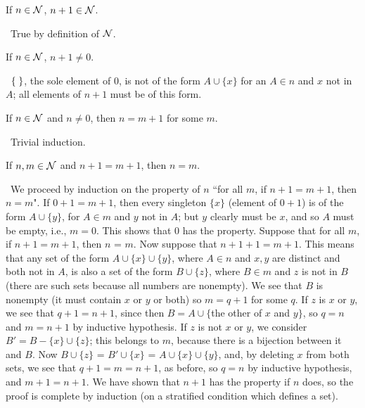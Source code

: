 \begin{thm}
 If $n \in {\cal N}$, $n+1 \in {\cal N}$.
\end{thm}

\preuve\ True by definition of ${\cal N}$.
\finpreuve

\begin{thm}
 If $n \in {\cal N}$, $n+1 \neq 0$.
\end{thm}

\preuve\ $\mbox{$\{\;\}$}$, the sole element of 0, is not of the form $A \cup \{x\}$ for
an $A \in n$ and $x$ not in $A$; all elements of $n+1$ must be of this form.
\finpreuve

\begin{thm}
 If $n \in {\cal N}$ and $n \neq 0$, then $n = m+1$ for some $m$.
\end{thm}

\preuve\ Trivial induction.
\finpreuve

\begin{thm}
 If $n,m \in {\cal N}$ and $n+1 = m+1$, then $n = m$.
\end{thm}

\preuve\ We proceed by induction on the property of $n$ ``for all $m$, if $n+1
= m+1$, then $n = m$".  If $0+1 = m+1$, then every singleton
$\{x\}$ (element of $0+1$) is of the form $A \cup \{y\}$, for $A \in m$ and $y$
not in $A$; but $y$ clearly must be $x$, and so $A$ must be empty, i.e., $m =
0$.  This shows that 0 has the property.  Suppose that for all $m$, if $n+1 =
m+1$, then $n$ = $m$.  Now suppose that $n+1+1 = m+1$.  This means that any set
of the form $A \cup \{x\} \cup \{y\}$, where $A \in n$ and $x, y$ are distinct
and both not in $A$, is also a set of the form $B \cup \{z\}$, where $B \in m$
and $z$ is not in $B$ (there are such sets because all numbers are nonempty).
We see that $B$ is nonempty (it must contain $x$ or $y$ or both) so $m = q+1$
for some $q$.
If $z$ is $x$ or $y$, we see that $q+1 = n+1$, since then $B = A \cup \{$the
other of $x$ and $y\}$, so $q = n$ and $m = n+1$ by inductive hypothesis.  If
$z$ is not $x$ or $y$, we consider $B' = B - \{x\} \cup \{z\}$; this belongs to
$m$, because there is a bijection between it and $B$.  Now $B
\cup \{z\}$ = $B' \cup \{x\}$ = $A \cup \{x\} \cup \{y\}$, and, by deleting $x$
from both sets, we see that $q+1 = m = n+1$, as before, so $q = n$ by inductive
hypothesis, and $m+1 = n+1$.  We have shown that $n+1$ has the property if $n$
does, so the proof is complete by induction (on a
stratified condition which defines a set).
\finpreuve

